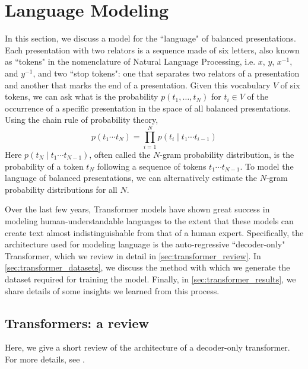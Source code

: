 
\section{Language Modeling} \label{sec:lm}

In this section, we discuss a model for the ``language" of balanced presentations.
Each presentation with two relators is a sequence made of six letters, also known as ``tokens" in the nomenclature of Natural Language Processing, i.e. $x$, $y$, $x^{-1}$, and $y^{-1}$, and two ``stop tokens": one that separates two relators of a presentation and another that marks the end of a presentation.
Given this vocabulary $V$ of six tokens, we can ask what is the probability $p(t_1, \dots, t_N)$ for $t_i \in V$ of the occurrence of a specific presentation in the space of all balanced presentations.
Using the chain rule of probability theory,
\[
p(t_1 \cdots t_{N}) = \prod \limits_{i=1}^{N} p (t_{i} \mid t_{1} \cdots t_{i-1})
\]
Here $p (t_{N} \mid t_{1} \cdots t_{N-1})$, often called the $N$-gram probability distribution, is the probability of a token $t_N$ following a sequence of tokens $t_{1} \cdots t_{N-1}$.
To model the language of balanced presentations, we can alternatively estimate the $N$-gram probability distributions for all $N$.

Over the last few years, Transformer models have shown great success in modeling human-understandable languages to the extent that these models can create text almost indistinguishable from that of a human expert.
Specifically, the architecture used for modeling language is the auto-regressive ``decoder-only" Transformer, which we review in detail in \autoref{sec:transformer_review}.
In \autoref{sec:transformer_datasets}, we discuss the method with which we generate the dataset required for training the model.
Finally, in \autoref{sec:transformer_results}, we share details of some insights we learned from this process.

\subsection{Transformers: a review\label{sec:transformer_review}}

Here, we give a short review of the architecture of a decoder-only transformer.
For more details, see \cite{vaswani2023attention, elhage2021mathematical, douglas2023large}.


